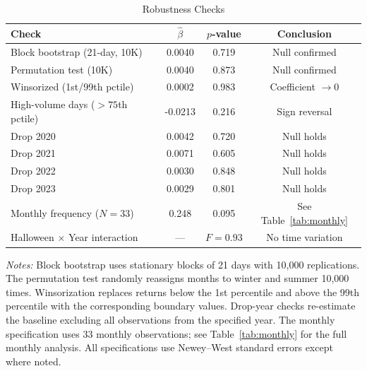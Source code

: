 \documentclass[12pt,a4paper]{article}
\begin{document}
\begin{table}[htbp]
\centering
\begin{threeparttable}
\caption{Robustness Checks}
\label{tab:robustness}

\begin{tabular*}{\textwidth}{@{\extracolsep{\fill}} lccc}
\toprule
Check & $\hat{\beta}$ & $p$-value & Conclusion \\
\midrule
Block bootstrap (21-day, 10K)        & 0.0040  & 0.719   & Null confirmed \\
Permutation test (10K)               & 0.0040  & 0.873   & Null confirmed \\
Winsorized (1st/99th pctile)         & 0.0002  & 0.983   & Coefficient $\to 0$ \\
High-volume days ($>75$th pctile)    & -0.0213 & 0.216   & Sign reversal \\
Drop 2020                            & 0.0042  & 0.720   & Null holds \\
Drop 2021                            & 0.0071  & 0.605   & Null holds \\
Drop 2022                            & 0.0030  & 0.848   & Null holds \\
Drop 2023                            & 0.0029  & 0.801   & Null holds \\
Monthly frequency ($N=33$)           & 0.248   & 0.095   & See Table~\ref{tab:monthly} \\
Halloween $\times$ Year interaction  & ---     & $F=0.93$ & No time variation \\
\bottomrule
\end{tabular*}

\begin{tablenotes}[flushleft]
\footnotesize
\item \textit{Notes:} Block bootstrap uses stationary blocks of 21 days with 10,000 replications. The permutation test randomly reassigns months to winter and summer 10,000 times. Winsorization replaces returns below the 1st percentile and above the 99th percentile with the corresponding boundary values. Drop-year checks re-estimate the baseline excluding all observations from the specified year. The monthly specification uses 33 monthly observations; see Table~\ref{tab:monthly} for the full monthly analysis. All specifications use Newey--West standard errors except where noted.
\end{tablenotes}

\end{threeparttable}
\end{table}
\end{document}
